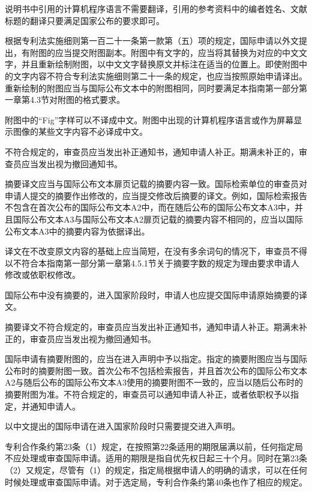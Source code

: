 说明书中引用的计算机程序语言不需要翻译，引用的参考资料中的编者姓名、文献标题的翻译只要满足国家公布的要求即可。

根据专利法实施细则第一百二十一条第一款第（五）项的规定，国际申请以外文提出，有附图的应当提交附图副本。附图中有文字的，应当将其替换为对应的中文文字，并且重新绘制附图，以中文文字替换原文并标注在适当的位置上。即使附图中的文字内容不符合专利法实施细则第二十一条的规定，也应当按照原始申请译出。重新绘制的附图应当与国际公布文本中的附图相同，同时要满足本指南第一部分第一章第4.3节对附图的格式要求。

附图中的“Fig”字样可以不译成中文。附图中出现的计算机程序语言或作为屏幕显示图像的某些文字内容不必译成中文。

不符合规定的，审查员应当发出补正通知书，通知申请人补正。期满未补正的，审查员应当发出视为撤回通知书。

{\setlength{\parindent}{0.0bp}摘要译文应当与国际公布文本扉页记载的摘要内容一致。国际检索单位的审查员对申请人提交的摘要作出修改的，应当提交修改后摘要的译文。例如，国际检索报告不包含在首次公布的国际公布文本A2中，而在随后公布的国际公布文本A3中，并且国际公布文本A3与国际公布文本A2扉页记载的摘要内容不相同的，应当以国际公布文本A3中的摘要内容为依据译出。\par}

译文在不改变原文内容的基础上应当简短，在没有多余词句的情况下，审查员不得以不符合本指南第一部分第一章第4.5.1节关于摘要字数的规定为理由要求申请人修改或依职权修改。

国际公布中没有摘要的，进入国家阶段时，申请人也应提交国际申请原始摘要的译文。

摘要译文不符合规定的，审查员应当发出补正通知书，通知申请人补正。期满未补正的，审查员应当发出视为撤回通知书。

国际申请有摘要附图的，应当在进入声明中予以指定。指定的摘要附图应当与国际公布时的摘要附图一致。首次公布不包括检索报告，并且首次公布的国际公布文本A2与随后公布的国际公布文本A3使用的摘要附图不一致的，应当以随后公布时的摘要附图为准。不符合规定的，审查员可以通知申请人补正，或者依职权予以指定，并通知申请人。

{\setlength{\parindent}{22.5bp}以中文提出的国际申请在进入国家阶段时只需要提交进入声明。\par}

专利合作条约第23条（1）规定，在按照第22条适用的期限届满以前，任何指定局不应处理或审查国际申请。适用的期限是指自优先权日起三十个月。同时在第23条（2）又规定，尽管有（1）的规定，指定局根据申请人的明确的请求，可以在任何时候处理或审查国际申请。对于选定局，专利合作条约第40条也作了相应的规定。

